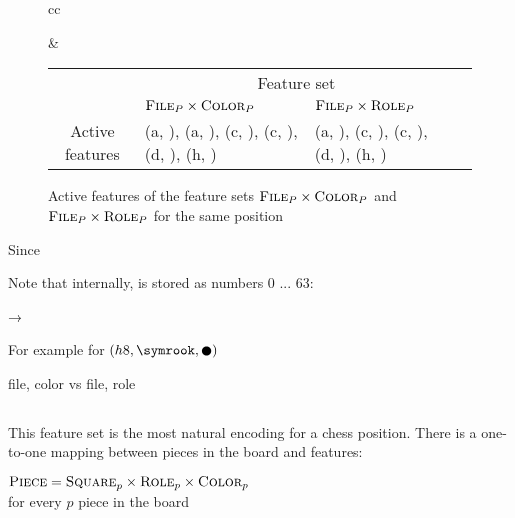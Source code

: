 \begin{figure}[h]
\centering
\label{fig:active_features}

\begin{tabular}{cc}
\raisebox{-7ex}{
\chessboard[
    tinyboard,
    showmover=false,
    setwhite={kc3, nc2, pa2, Pd4},
    addblack={Kc8,bh7, pa7}
]
}

&

\begin{tabular}{|c|p{4cm}|p{4cm}|p{0cm}}
\cline{2-3}
\multicolumn{1}{c|}{} & \multicolumn{2}{c|}{\centering Feature set} \\
\cline{2-3}
\multicolumn{1}{c|}{} & \centering $\textsc{File}_{P} \times \textsc{Color}_{P}$ & \centering $\textsc{File}_{P} \times \textsc{Role}_{P}$ & \\
\cline{1-3}
Active features &
(a, \white), (a, \black), (c, \black), (c, \white), (d, \white), (h, \black) &
(a, \sympawn), (c, \symking), (c, \symknight), (d, \sympawn), (h, \symbishop) \\
\cline{1-3}
\end{tabular}

\end{tabular}

\caption{Active features of the feature sets $\textsc{File}_{P} \times \textsc{Color}_{P}$ and $\textsc{File}_{P} \times \textsc{Role}_{P}$ for the same position}
\end{figure}


Since

Note that internally,  is stored as numbers 0 ... 63:

\pieceBoard → \pieceBoard


For example for $(h8, \symrook, \black)$

file, color vs file, role

\subsection{\mdseries{}}

This feature set is the most natural encoding for a chess position. There is a one-to-one mapping between pieces in the board and features:

\begin{center}
    $\textsc{Piece} = \textsc{Square}_{p} \times \textsc{Role}_{p} \times \textsc{Color}_{p}$ \\
    for every $p$ piece in the board
\end{center}




